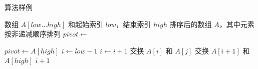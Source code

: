 \begin{algorithm}[H]
  \caption{算法样例}\label{alg:sample}
  \begin{algorithmic}[1] %
    \Require 数组 $A[low...high]$ 和起始索引 $low$，结束索引 $high$ %
    \Ensure 排序后的数组 $A$，其中元素按非递减顺序排列 %
        \State $pivot \gets$  %
        \State {}
        \State {}
      \EndIf
    \EndFunction
    
    \Statex
    
      \State $pivot \gets A[high]$  
      \State $i \gets low-1$  
          \State $i \gets i+1$
          \State 交换 $A[i]$ 和 $A[j]$
        \EndIf
      \EndFor
      \State 交换 $A[i+1]$ 和 $A[high]$
      \State \Return $i+1$ %
    \EndFunction
  \end{algorithmic}
\end{algorithm}